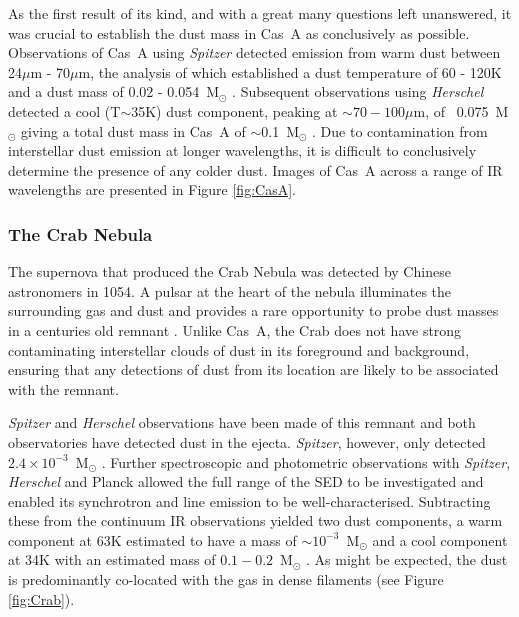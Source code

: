 
As the first result of its kind, and with a great many questions left unanswered, it was crucial to establish the dust mass in Cas~A as conclusively as possible.   Observations of Cas~A using \textit{Spitzer} detected emission from warm dust between 24$\mu$m - 70$\mu$m, the analysis of which established a dust temperature of 60 - 120K and a dust mass of 0.02 - 0.054~M$_{\odot}$ \citep{Rho2008}.  Subsequent observations using \textit{Herschel} detected a cool (T$\sim$35K) dust component, peaking at $\sim70-100\mu$m, of ~0.075~M$_{\odot}$ giving a total dust mass in Cas~A of $\sim$0.1~M$_{\odot}$ \citep{Barlow2010}.  Due to contamination from interstellar dust emission at longer wavelengths, it is difficult to conclusively determine the presence of any colder dust.  Images of Cas~A across a range of IR wavelengths are presented in Figure \ref{fig:CasA}.  

\subsubsection{The Crab Nebula}

The supernova that produced the Crab Nebula was detected by Chinese astronomers in 1054.  A pulsar at the heart of the nebula illuminates the surrounding gas and dust and provides a rare opportunity to probe dust masses in a centuries old remnant \citep{CrabPulsar}.  Unlike Cas~A, the Crab does not have strong contaminating interstellar clouds of dust in its foreground and background, ensuring that any detections of dust from its location are likely to be associated with the remnant.
 
\textit{Spitzer} and \textit{Herschel} observations have been made of this remnant and both observatories have detected dust in the ejecta.  {\em Spitzer}, however, only detected $2.4\times10^{-3}$~M$_{\odot}$ \citep{Temim2012}.  Further spectroscopic and photometric observations with {\em Spitzer}, {\em Herschel} and Planck allowed the full range of the SED to be investigated and enabled its synchrotron and line emission to be well-characterised.  Subtracting these from the continuum IR observations yielded two dust components, a warm component at 63K estimated to have a mass of $\sim10^{-3}$~M$_{\odot}$ and a cool component at  34K with an estimated mass of $0.1 - 0.2$~M$_{\odot}$ \citep{Gomez2012}.  As might be expected, the dust is predominantly co-located with the gas in dense filaments (see Figure \ref{fig:Crab}).
 
